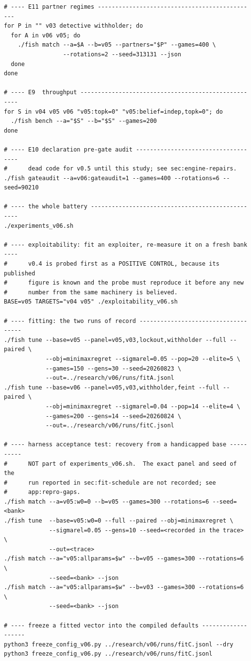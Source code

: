 \begin{verbatim}
# ---- E11 partner regimes ----------------------------------------------
for P in "" v03 detective withholder; do
  for A in v06 v05; do
    ./fish match --a=$A --b=v05 --partners="$P" --games=400 \
                 --rotations=2 --seed=313131 --json
  done
done

# ---- E9  throughput ----------------------------------------------------
for S in v04 v05 v06 "v05:topk=0" "v05:belief=indep,topk=0"; do
  ./fish bench --a="$S" --b="$S" --games=200
done

# ---- E10 declaration pre-gate audit ------------------------------------
#      dead code for v0.5 until this study; see sec:engine-repairs.
./fish gateaudit --a=v06:gateaudit=1 --games=400 --rotations=6 --seed=90210

# ---- the whole battery -------------------------------------------------
./experiments_v06.sh

# ---- exploitability: fit an exploiter, re-measure it on a fresh bank ----
#      v0.4 is probed first as a POSITIVE CONTROL, because its published
#      figure is known and the probe must reproduce it before any new
#      number from the same machinery is believed.
BASE=v05 TARGETS="v04 v05" ./exploitability_v06.sh

# ---- fitting: the two runs of record ------------------------------------
./fish tune --base=v05 --panel=v05,v03,lockout,withholder --full --paired \
            --obj=minimaxregret --sigmarel=0.05 --pop=20 --elite=5 \
            --games=150 --gens=30 --seed=20260823 \
            --out=../research/v06/runs/fitA.jsonl
./fish tune --base=v06 --panel=v05,v03,withholder,feint --full --paired \
            --obj=minimaxregret --sigmarel=0.04 --pop=14 --elite=4 \
            --games=200 --gens=14 --seed=20260824 \
            --out=../research/v06/runs/fitC.jsonl

# ---- harness acceptance test: recovery from a handicapped base ----------
#      NOT part of experiments_v06.sh.  The exact panel and seed of the
#      run reported in sec:fit-schedule are not recorded; see
#      app:repro-gaps.
./fish match --a=v05:w0=0 --b=v05 --games=300 --rotations=6 --seed=<bank>
./fish tune  --base=v05:w0=0 --full --paired --obj=minimaxregret \
             --sigmarel=0.05 --gens=10 --seed=<recorded in the trace> \
             --out=<trace>
./fish match --a="v05:allparams=$w" --b=v05 --games=300 --rotations=6 \
             --seed=<bank> --json
./fish match --a="v05:allparams=$w" --b=v03 --games=300 --rotations=6 \
             --seed=<bank> --json

# ---- freeze a fitted vector into the compiled defaults -------------------
python3 freeze_config_v06.py ../research/v06/runs/fitC.jsonl --dry
python3 freeze_config_v06.py ../research/v06/runs/fitC.jsonl
\end{verbatim}

